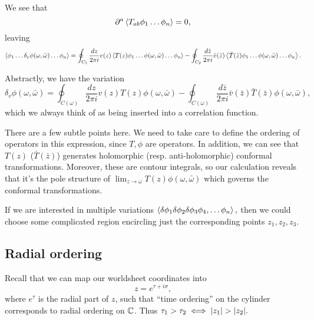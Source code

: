 We see that
\begin{equation}
    \partial^a \left< T_{ab}\phi_1 \ldots \phi_n \right>=0,
\end{equation}
leaving
\begin{equation}
    \left< \phi_1 \ldots \delta_v \phi(\omega,\bar \omega)\ldots \phi_n \right> = \oint_{C_1} \frac{dz}{2\pi i} v(z) \left< T(z)\phi_1 \ldots\phi(\omega,\bar \omega)\ldots \phi_n \right>
        -\oint_{C_2} \frac{d\bar z}{2\pi i} \bar v(\bar z) \left< \bar T(\bar z)\phi_1 \ldots\phi(\omega,\bar \omega)\ldots \phi_n \right>.
\end{equation}

Abstractly, we have the variation
\begin{equation}
    \delta_v \phi(\omega, \bar \omega)=\oint_{C(\omega)}\frac{dz}{2\pi i }v(z) T(z) \phi(\omega,\bar \omega)-\oint_{C(\omega)} \frac{d\bar z}{2\pi i} \bar v(\bar z) \bar T (\bar z)\phi(\omega,\bar \omega),
\end{equation}
which we always think of as being inserted into a correlation function.

There are a few subtle points here. We need to take care to define the ordering of operators in this expression, since $T,\phi$ are operators. In addition, we can see that $T(z)$ ($\bar T(\bar z)$) generates holomorphic (resp. anti-holomorphic) conformal transformations. Moreover, these are contour integrals, so our calculation reveals that it's the pole structure of $\lim_{z\to \omega} T(z)\phi(\omega,\bar \omega)$ which governs the conformal transformations.

If we are interested in multiple variations $\left< \delta \phi_1 \delta\phi_2 \delta\phi_3 \phi_4,\ldots \phi_n \right>,$ then we could choose some complicated region encircling just the corresponding points $z_1,z_2,z_3$.

\subsection*{Radial ordering} Recall that we can map our worldsheet coordinates into
\begin{equation}
    z=e^{\tau+i\sigma},
\end{equation}
where $e^\tau$ is the radial part of $z$, such that ``time ordering'' on the cylinder corresponds to radial ordering on $\mathbb{C}$. Thus $\tau_1 > \tau_2 \iff \lvert z_1\rvert >\lvert z_2\rvert.$

